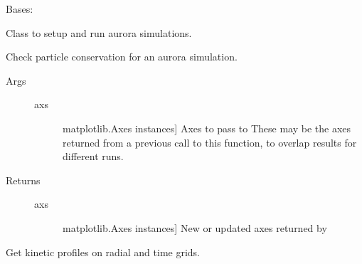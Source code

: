 \documentclass[letterpaper,10pt,english]{sphinxmanual}
\begin{document}
\begin{fulllineitems}
\label{\detokenize{aurora:aurora.core.aurora_sim}}
Bases: 

Class to setup and run aurora simulations.

\begin{fulllineitems}
\label{\detokenize{aurora:aurora.core.aurora_sim.check_conservation}}
Check particle conservation for an aurora simulation.
\begin{description}
\item[{Args}] \leavevmode{[}{]}\begin{description}
\item[{axs}] \leavevmode{[}matplotlib.Axes instances{]}
Axes to pass to 
These may be the axes returned from a previous call to this function, to overlap 
results for different runs.

\end{description}

\item[{Returns}] \leavevmode{[}{]}\begin{description}
\item[{axs}] \leavevmode{[}matplotlib.Axes instances{]}
New or updated axes returned by 

\end{description}

\end{description}

\end{fulllineitems}


\begin{fulllineitems}
\label{\detokenize{aurora:aurora.core.aurora_sim.get_aurora_kin_profs}}
Get kinetic profiles on radial and time grids.


\end{fulllineitems}
\end{fulllineitems}
\end{document}
